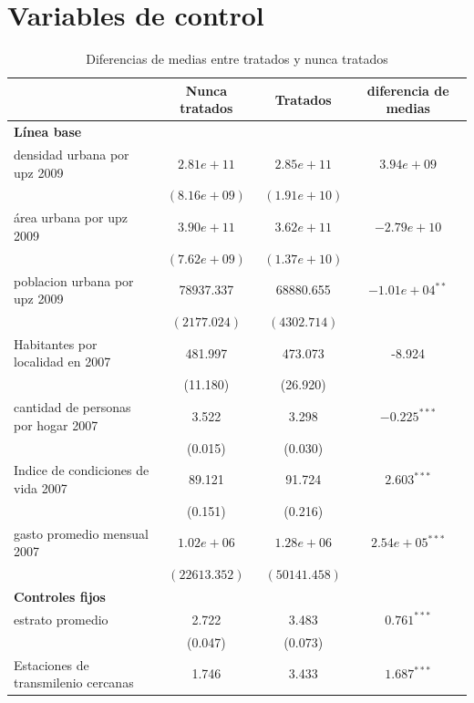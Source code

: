 \documentclass{article}
\begin{document}
\section{Variables de control}

\begin{table} [H]
  \centering
  \caption{Diferencias de medias entre tratados y nunca tratados}
  \label{tab:diferencias_medias}
  \begin{adjustbox}{width=\textwidth,center}
    \begin{tabular}{l c c c}
      \toprule
      \multicolumn{1}{c}{} & \multicolumn{1}{c}{\textbf{Nunca tratados}} & \multicolumn{1}{c}{\textbf{Tratados}} & \multicolumn{1}{c}{\textbf{diferencia de medias}} \\
      \midrule
       \midrule
      \multicolumn{4}{l}{\textbf{Línea base}} \\
      \midrule
      densidad urbana por upz 2009 & $2.81e+11$ & $2.85e+11$ & $3.94e+09$ \\
      & $(8.16e+09)$ & $(1.91e+10)$ & \\
      área urbana por upz 2009 & $3.90e+11$ & $3.62e+11$ & $-2.79e+10$ \\
      & $(7.62e+09)$ & $(1.37e+10)$ & \\
      poblacion urbana por upz 2009 & 78937.337 & 68880.655 & $-1.01e+04^{**}$ \\
      & $(2177.024)$ & $(4302.714)$ & \\
      Habitantes por localidad en 2007 & 481.997 & 473.073 & -8.924 \\
      & (11.180) & (26.920) & \\
      cantidad de personas por hogar 2007 & 3.522 & 3.298 & $-0.225^{***}$ \\
      & (0.015) & (0.030) & \\
      Indice de condiciones de vida 2007 & 89.121 & 91.724 & $2.603^{***}$ \\
      & (0.151) & (0.216) & \\
      gasto promedio mensual 2007 & $1.02e+06$ & $1.28e+06$ & $2.54e+05^{***}$ \\
      & $(22613.352)$ & $(50141.458)$ & \\
      \midrule
      \multicolumn{4}{l}{\textbf{Controles fijos}} \\
      \midrule
      estrato promedio & 2.722 & 3.483 & $0.761^{***}$ \\
      & (0.047) & (0.073) & \\
      Estaciones de transmilenio cercanas & 1.746 & 3.433 & $1.687^{***}$ \\

\end{tabular}
\end{adjustbox}
\end{table}
\end{document}
